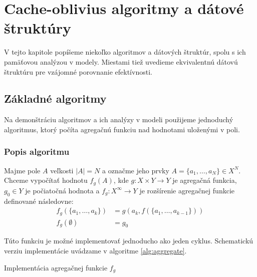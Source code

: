 \chapter{Cache-oblivius algoritmy a dátové štruktúry}

V tejto kapitole popíšeme niekoľko \obliv algoritmov a dátových štruktúr, spolu s ich pamäťovou analýzou v \obliv modely. Miestami tiež uvedieme ekvivalentnú \aware dátovú štruktúru pre vzájomné porovnanie efektívnosti.

\section{Základné algoritmy}

Na demonštráciu \obliv algoritmov a ich analýzy v \extmem modeli použijeme jednoduchý algoritmus, ktorý počíta agregačnú funkciu nad hodnotami uloženými v poli.

\subsection{Popis algoritmu}
Majme pole $A$ veľkosti $|A|=N$ a označme jeho prvky $A = \{a_1,\dotsc,a_N\} \in X^N$. Chceme vypočítať hodnotu $f_g(A)$, kde $g: X \times Y \rightarrow Y$ je agregačná funkcia, $g_0 \in Y$ je počiatočná hodnota a $f_g: X^\infty \rightarrow Y$ je rozšírenie agregačnej funkcie definované následovne: 
\[
\begin{aligned}
f_g(\{a_1,\dotsc,a_k\}) &= g(a_k, f(\{a_1,\dotsc,a_{k-1}\})) \\
f_g(\emptyset) &= g_0
\end{aligned}
\]

Túto funkciu je možné implementovať jednoducho ako jeden cyklus. Schematickú verziu implementácie uvádzame v algoritme \ref{alg:aggregate}.

\begin{algorithm}
    \caption{Implementácia agregačnej funkcie $f_g$}
    \label{alg:aggregate}
    \begin{algorithmic}[1]
            \EndFor
            \State {}
        \EndFunction
    \end{algorithmic}
\end{algorithm}

